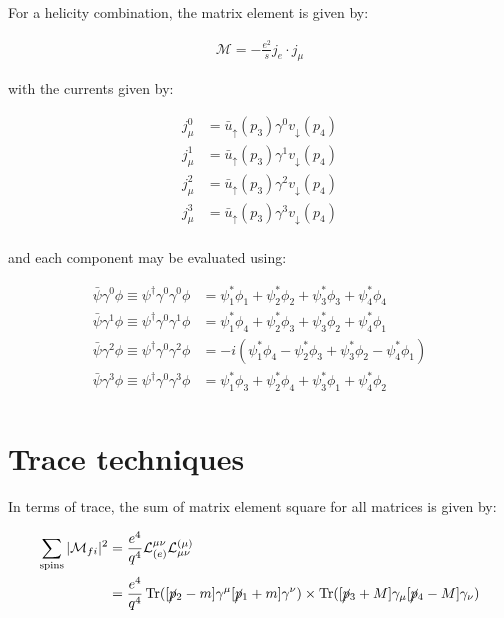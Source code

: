 \documentclass[10pt]{article}
\theoremstyle{definition}
\begin{document}
For a helicity combination, the matrix element is given by:

\begin{align}
    \mathcal{M} = -\frac{e^2}{s}j_e\cdot j_{\mu}
\end{align}

with the currents given by:

\begin{align*}
    j^0_{\mu} &= \bar{u}_{\uparrow}(p_3)\gamma^0 v_{\downarrow}(p_4)\\
    j^1_{\mu} &= \bar{u}_{\uparrow}(p_3)\gamma^1 v_{\downarrow}(p_4)\\
    j^2_{\mu} &= \bar{u}_{\uparrow}(p_3)\gamma^2 v_{\downarrow}(p_4)\\
    j^3_{\mu} &= \bar{u}_{\uparrow}(p_3)\gamma^3 v_{\downarrow}(p_4)\\
\end{align*}

and each component may be evaluated using: 

\begin{align*}
    \bar{\psi}\gamma^{0}\phi \equiv \psi^{\dagger}\gamma^{0}\gamma^{0}\phi &=
    \psi_1^*\phi_1 + \psi_2^*\phi_2 + \psi_3^*\phi_3 + \psi_4^*\phi_4\\
    \bar{\psi}\gamma^{1}\phi \equiv \psi^{\dagger}\gamma^{0}\gamma^{1}\phi &=
    \psi_1^*\phi_4 + \psi_2^*\phi_3 + \psi_3^*\phi_2 + \psi_4^*\phi_1\\
    \bar{\psi}\gamma^{2}\phi \equiv \psi^{\dagger}\gamma^{0}\gamma^{2}\phi &=
    -i(\psi_1^*\phi_4 - \psi_2^*\phi_3 + \psi_3^*\phi_2 - \psi_4^*\phi_1)\\
    \bar{\psi}\gamma^{3}\phi \equiv \psi^{\dagger}\gamma^{0}\gamma^{3}\phi &=
    \psi_1^*\phi_3 + \psi_2^*\phi_4 + \psi_3^*\phi_1 + \psi_4^*\phi_2\\
\end{align*}



\section*{Trace techniques}

In terms of trace, the sum of matrix element square for all matrices is given by:

\begin{align}
    \sum_{\text{spins}} |\mathcal{M}_{fi}|^2 &= \frac{e^4}{q^4} \mathcal{L}^{\mu\nu}_{(e)}\mathcal{L}^{(\mu)}_{\mu\nu}\\
    &= \frac{e^4}{q^4}\Trace ([\cancel{p}_2-m]\gamma^{\mu}[\cancel{p}_1+m]\gamma^{\nu}) \times \Trace ([\cancel{p}_3+M]\gamma_{\mu}[\cancel{p}_4-M]\gamma_{\nu})
\end{align}
\end{document}
